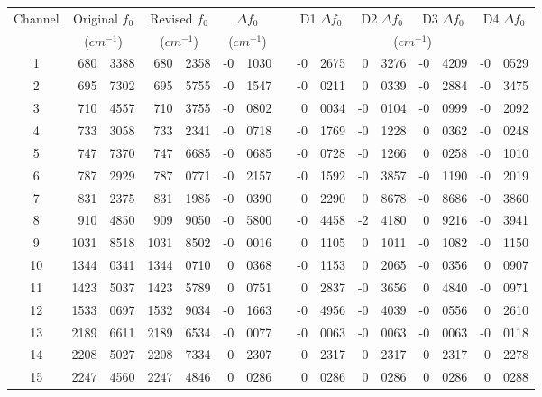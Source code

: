 \begin{table}[htp]
  \centering
  \begin{tabular}{c *{3}{r@{.}l} c *{4}{r@{.}l}}
    \hline
    Channel & \multicolumn{2}{c}{Original $f_0$} & \multicolumn{2}{c}{Revised $f_0$} & \multicolumn{2}{c}{$\Delta f_0$} & & \multicolumn{2}{c}{D1 $\Delta f_0$} & \multicolumn{2}{c}{D2 $\Delta f_0$} & \multicolumn{2}{c}{D3 $\Delta f_0$} & \multicolumn{2}{c}{D4 $\Delta f_0$} \\
            & \multicolumn{2}{c}{($cm^{-1}$)}    & \multicolumn{2}{c}{($cm^{-1}$)}   & \multicolumn{2}{c}{($cm^{-1}$)} & &  \multicolumn{8}{c}{($cm^{-1}$)}\\
    \hline\hline
       1    &  680&3388 &  680&2358 & -0&1030 & & -0&2675 &  0&3276 & -0&4209 & -0&0529 \\
       2    &  695&7302 &  695&5755 & -0&1547 & & -0&0211 &  0&0339 & -0&2884 & -0&3475 \\
       3    &  710&4557 &  710&3755 & -0&0802 & &  0&0034 & -0&0104 & -0&0999 & -0&2092 \\
       4    &  733&3058 &  733&2341 & -0&0718 & & -0&1769 & -0&1228 &  0&0362 & -0&0248 \\
       5    &  747&7370 &  747&6685 & -0&0685 & & -0&0728 & -0&1266 &  0&0258 & -0&1010 \\
       6    &  787&2929 &  787&0771 & -0&2157 & & -0&1592 & -0&3857 & -0&1190 & -0&2019 \\
       7    &  831&2375 &  831&1985 & -0&0390 & &  0&2290 &  0&8678 & -0&8686 & -0&3860 \\
       8    &  910&4850 &  909&9050 & -0&5800 & & -0&4458 & -2&4180 &  0&9216 & -0&3941 \\
       9    & 1031&8518 & 1031&8502 & -0&0016 & &  0&1105 &  0&1011 & -0&1082 & -0&1150 \\
      10    & 1344&0341 & 1344&0710 &  0&0368 & & -0&1153 &  0&2065 & -0&0356 &  0&0907 \\
      11    & 1423&5037 & 1423&5789 &  0&0751 & &  0&2837 & -0&3656 &  0&4840 & -0&0971 \\
      12    & 1533&0697 & 1532&9034 & -0&1663 & & -0&4956 & -0&4039 & -0&0556 &  0&2610 \\
      13    & 2189&6611 & 2189&6534 & -0&0077 & & -0&0063 & -0&0063 & -0&0063 & -0&0118 \\
      14    & 2208&5027 & 2208&7334 &  0&2307 & &  0&2317 &  0&2317 &  0&2317 &  0&2278 \\
      15    & 2247&4560 & 2247&4846 &  0&0286 & &  0&0286 &  0&0286 &  0&0286 &  0&0288 \\

\end{tabular}
\end{table}
